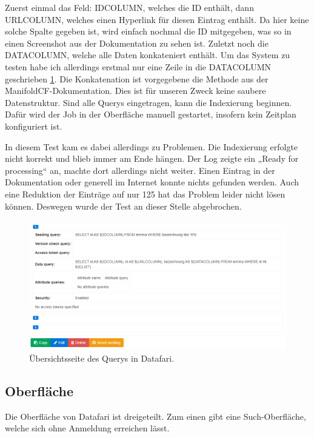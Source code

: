 Zuerst einmal das Feld: IDCOLUMN, welches die ID enthält, dann URLCOLUMN, welches einen Hyperlink für diesen Eintrag enthält. Da hier keine solche Spalte gegeben ist, wird einfach nochmal die ID mitgegeben, was so in einen Screenshot aus der Dokumentation zu sehen ist. Zuletzt noch die DATACOLUMN, welche alle Daten konkateniert enthält. Um das System zu testen habe ich allerdings erstmal nur eine Zeile in die DATACOLUMN geschrieben \ref{img:datafariQuery}. Die Konkatenation ist vorgegebene die Methode aus der ManifoldCF-Dokumentation. \cite[S.~97]{ApacheSoftwareFoundation.} Dies ist für unseren Zweck keine saubere Datenstruktur.
Sind alle Querys eingetragen, kann die Indexierung beginnen. Dafür wird der Job in der Oberfläche manuell gestartet, insofern kein Zeitplan konfiguriert ist.

In diesem Test kam es dabei allerdings zu Problemen. Die Indexierung erfolgte nicht korrekt und blieb immer am Ende hängen. Der Log zeigte ein „Ready for processing“ an, machte dort allerdings nicht weiter. Einen Eintrag in der Dokumentation oder generell im Internet konnte nichts gefunden werden. Auch eine Reduktion der Einträge auf nur 125 hat das Problem leider nicht lösen können. Deswegen wurde der Test an dieser Stelle abgebrochen. 

\begin{figure}
	\centering
	\includegraphics[width=1\linewidth]{images/datafari_query.png}
	\caption{Übersichtsseite des Querys in Datafari.}
	\label{img:datafariQuery}
\end{figure}

\subsection{Oberfläche}

Die Oberfläche von Datafari ist dreigeteilt. Zum einen gibt eine Such-Oberfläche, welche sich ohne Anmeldung erreichen lässt. 

